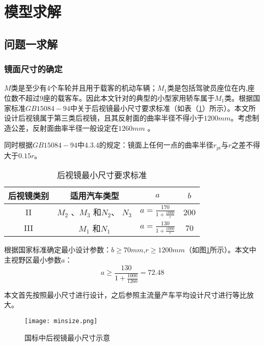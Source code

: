 \documentclass[withoutpreface,bwprint]{cumcmthesis} %
\begin{document}
\section{模型求解}

\subsection{问题一求解}

\subsubsection{镜面尺寸的确定}
\par $M$类是至少有4个车轮并且用于载客的机动车辆；$M_1$类是包括驾驶员座位在内,座位数不超过9座的载客车。因此本文针对的典型的小型家用轿车属于$M_1$类。根据国家标准$GB 15084-94$中关于后视镜最小尺寸要求标准（如表（\ref{后视镜最小尺寸要求标准}）所示）。本文所设计后视镜属于第三类后视镜，且其反射面的曲率半径不得小于$1200mm$。考虑制造公差，反射面曲率半径一般设定在$1260mm$ 。

\par 同时根据$GB 15084-94$中4.3.4的规定：镜面上任何一点的曲率半径$r_{pi}$与$r$之差不得大于$0.15r$。

\begin{table}[!htbp]
\centering
\caption{后视镜最小尺寸要求标准}
\label{后视镜最小尺寸要求标准}
\begin{tabular}{cccc}
\toprule
后视镜类别 & 适用汽车类型 & $a$ & $b$	\\ \midrule
 II	 & $M_2$ 、$M_3$ 和$N_2$、 $N_3$ &  $a =  \frac{170}{1+\frac{1000}{r}}$& 200\\ 
III & $M_1$ 和$N_1$& $a =  \frac{130}{1+\frac{1000}{r}}$&  70\\ 
\bottomrule 
\end{tabular}
\end{table}

\par 根据国家标准确定最小设计参数：$b \geqslant 70mm$,$r \geqslant 1200mm$（如图\ref{fig:后视镜最小尺寸示意}所示）。本文中主视野区最小参数$a$：
$$a \geqslant \frac{130}{1+\frac{1000}{1260}} = 72.48$$

\par 本文首先按照最小尺寸进行设计，之后参照主流量产车平均设计尺寸进行等比放大。
\begin{figure}[h]
\small
\centering
\texttt{[image: minsize.png]}
\caption{国标中后视镜最小尺寸示意} \label{fig:后视镜最小尺寸示意}
\end{figure}
\end{document}
